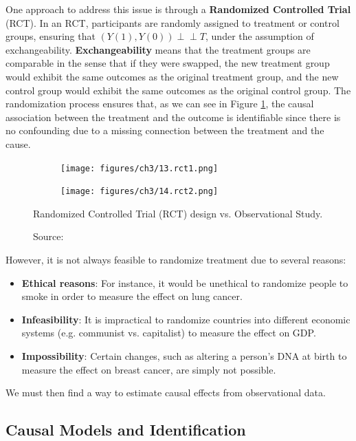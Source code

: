 One approach to address this issue is
through a \textbf{Randomized Controlled Trial} (RCT). In an RCT, participants
are randomly assigned to treatment or control groups, ensuring that
\( (Y(1), Y(0)) \perp\!\!\!\perp T \), under the assumption of exchangeability.
\textbf{Exchangeability} means that the treatment groups are comparable in the
sense that if they were swapped, the new treatment group would exhibit
the same outcomes as the original treatment group, and the new control
group would exhibit the same outcomes as the original control group.
The randomization process ensures that, as we can see in Figure \ref{fig:rct},
the causal association between the treatment and the outcome is identifiable
since there is no confounding due to a missing connection between the
treatment and the cause.

\begin{figure}[h]
    \centering
    \begin{subfigure}{.5\textwidth}
      \centering
      \texttt{[image: figures/ch3/13.rct1.png]}
    \end{subfigure}%
    \begin{subfigure}{.5\textwidth}
      \centering
      \texttt{[image: figures/ch3/14.rct2.png]}
    \end{subfigure}
    \caption{Randomized Controlled Trial (RCT) design vs. Observational Study.}
    \vspace{-10px}
    \caption*{\scriptsize{Source: \cite{Neal_2020a}}}
    \label{fig:rct}
\end{figure}

However, it is not always feasible to randomize treatment due to several reasons:
\begin{itemize}
    \item \textbf{Ethical reasons}: For instance, it would be unethical
    to randomize people to smoke in order to measure the effect on lung cancer.
    \item \textbf{Infeasibility}: It is impractical to randomize
    countries into different economic systems
    (e.g. communist vs. capitalist) to measure the effect on GDP.
    \item \textbf{Impossibility}: Certain changes, such as altering a
    person's DNA at birth to measure the effect on breast cancer,
    are simply not possible.
\end{itemize}
We must then find a way to estimate causal effects from observational data.

\subsection{Causal Models and Identification}
\label{sec:causal_models}

